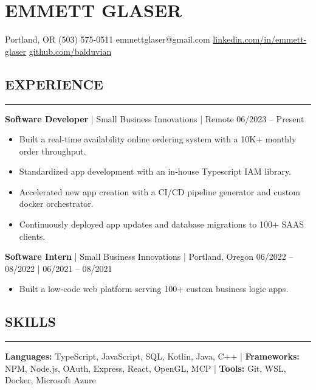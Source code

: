 \documentclass{article}
\newcommand{\HRule}[1][\medskipamount]{
	\par
	\vspace*{\dimexpr-\parskip-\baselineskip+#1}
	\noindent\rule{\linewidth}{0.2mm}\par
	\vspace*{\dimexpr-\parskip+0.1\baselineskip+#1}
}
\begin{document}
\section*{\centering EMMETT GLASER}

\small
\hspace*{\fill}
Portland, OR
\textbullet \space
(503) 575-0511
\textbullet \space
emmettglaser@gmail.com
\textbullet \space
\href{https://linkedin.com/in/emmett-glaser}{linkedin.com/in/emmett-glaser}
\textbullet \space
\href{https://github.com/balduvian}{github.com/balduvian}
\hspace*{\fill}

\normalsize

\subsection*{EXPERIENCE}
\HRule[6pt]

\noindent
\textbf{Software Developer} | Small Business Innovations | Remote
\hspace*{\fill}
06/2023 -- Present

\begin{itemize}
	\item Built a real-time availability online ordering system with a 10K+ monthly order throughput.
	\item Standardized app development with an in-house Typescript IAM library.
	\item Accelerated new app creation with a CI/CD pipeline generator and custom docker orchestrator.
	\item Continuously deployed app updates and database migrations to 100+ SAAS clients.
\end{itemize}

\noindent
\textbf{Software Intern} | Small Business Innovations | Portland, Oregon
\hspace*{\fill}
06/2022 -- 08/2022 | 06/2021 -- 08/2021

\begin{itemize}
	\item Built a low-code web platform serving 100+ custom business logic apps.
\end{itemize}

\subsection*{SKILLS}
\HRule[6pt]

\noindent
\textbf{Languages:} TypeScript, JavaScript, SQL, Kotlin, Java, C++ |
\textbf{Frameworks:} NPM, Node.js, OAuth, Express, React, OpenGL, MCP |
\textbf{Tools:} Git, WSL, Docker, Microsoft Azure
\end{document}
